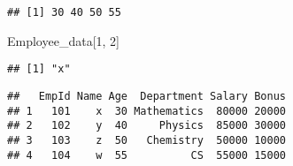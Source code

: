 \documentclass[
]{article}
\newenvironment{Shaded}{\begin{snugshade}}{\end{snugshade}}
\newcommand{\DecValTok}[1]{\textcolor[rgb]{0.00,0.00,0.81}{#1}}
\newcommand{\FunctionTok}[1]{\textcolor[rgb]{0.13,0.29,0.53}{\textbf{#1}}}
\newcommand{\NormalTok}[1]{#1}
\newcommand{\OtherTok}[1]{\textcolor[rgb]{0.56,0.35,0.01}{#1}}
\newcommand{\SpecialCharTok}[1]{\textcolor[rgb]{0.81,0.36,0.00}{\textbf{#1}}}
\begin{document}
\begin{verbatim}
## [1] 30 40 50 55
\end{verbatim}

\begin{Shaded}
\begin{Highlighting}[]
\NormalTok{Employee\_data[}\DecValTok{1}\NormalTok{, }\DecValTok{2}\NormalTok{]}
\end{Highlighting}
\end{Shaded}

\begin{verbatim}
## [1] "x"
\end{verbatim}

\begin{Shaded}
\end{Shaded}

\begin{verbatim}
##   EmpId Name Age  Department Salary Bonus
## 1   101    x  30 Mathematics  80000 20000
## 2   102    y  40     Physics  85000 30000
## 3   103    z  50   Chemistry  50000 10000
## 4   104    w  55          CS  55000 15000
\end{verbatim}
\end{document}

